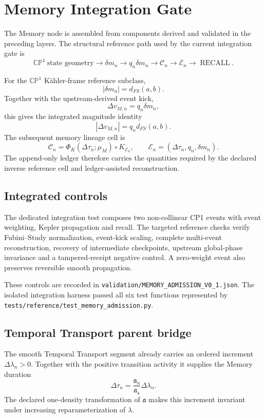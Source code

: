 \chapter{Memory Integration Gate}

The Memory node is assembled from components derived and validated in the preceding layers. The structural reference path used by the current integration gate is
\[
\boxed{
\mathbb{CP}^1\ \text{state geometry}
\longrightarrow
\delta m_n
\longrightarrow
q_n\delta m_n
\longrightarrow
\mathcal C_n
\longrightarrow
\mathcal E_n
\longrightarrow
\operatorname{RECALL}.
}
\]

For the \(\mathbb{CP}^1\) K\"ahler-frame reference subclass,
\[
|\delta m_n|=d_{FS}(a,b).
\]
Together with the upstream-derived event kick,
\[
\Delta v_{M,n}=q_n\delta m_n,
\]
this gives the integrated magnitude identity
\[
\boxed{
|\Delta v_{M,n}|=q_n d_{FS}(a,b).
}
\]
The subsequent memory lineage cell is
\[
\mathcal C_n
=\Phi_K(\Delta\tau_n;\mu_M)\circ K_{\mathcal E_n},
\qquad
\mathcal E_n=(\Delta\tau_n,q_n,\delta m_n).
\]
The append-only ledger therefore carries the quantities required by the declared inverse reference cell and ledger-assisted reconstruction.

\section{Integrated controls}

The dedicated integration test composes two non-collinear CP1 events with event weighting, Kepler propagation and recall. The targeted reference checks verify Fubini--Study normalization, event-kick scaling, complete multi-event reconstruction, recovery of intermediate checkpoints, upstream global-phase invariance and a tampered-receipt negative control. A zero-weight event also preserves reversible smooth propagation.

These controls are recorded in
\texttt{validation/MEMORY\_ADMISSION\_V0\_1.json}.
The isolated integration harness passed all six test functions represented by
\texttt{tests/reference/test\_memory\_admission.py}.

\section{Temporal Transport parent bridge}

The smooth Temporal Transport segment already carries an ordered increment \(\Delta\lambda_n>0\). Together with the positive transition activity it supplies the Memory duration
\[
\boxed{
\Delta\tau_n
=\frac{\mathfrak a_n}{\mathfrak a_\star}\Delta\lambda_n.
}
\]
The declared one-density transformation of \(\mathfrak a\) makes this increment invariant under increasing reparameterization of \(\lambda\).

